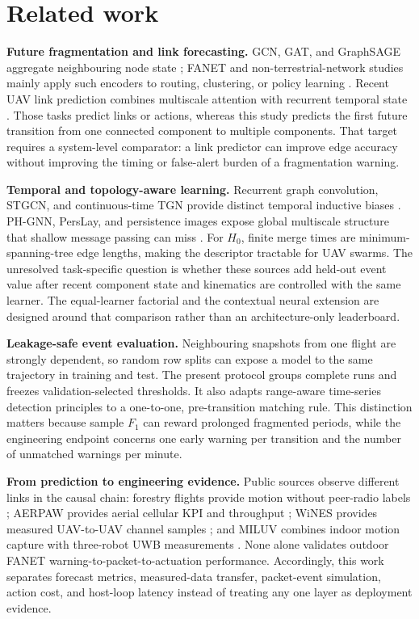 \documentclass[final,5p,times,twocolumn]{elsarticle}
\begin{document}
\section{Related work}

\textbf{Future fragmentation and link forecasting.} GCN, GAT, and GraphSAGE aggregate
neighbouring node state \cite{kipf2017semi,velickovic2018graph,hamilton2017inductive};
FANET and non-terrestrial-network studies mainly apply such encoders to routing,
clustering, or policy learning \cite{lu2023uav,song2025gnnppor,ye2022multi,nemati2022ntn,REN2025103801}.
Recent UAV link prediction combines multiscale attention with recurrent temporal state
\cite{pu2026must}. Those tasks predict links or actions, whereas this study predicts the
first future transition from one connected component to multiple components. That target
requires a system-level comparator: a link predictor can improve edge accuracy without
improving the timing or false-alert burden of a fragmentation warning.

\textbf{Temporal and topology-aware learning.} Recurrent graph convolution, STGCN, and
continuous-time TGN provide distinct temporal inductive biases
\cite{zhao2020tgcn,yu2018stgcn,rossi2020tgn}. PH-GNN, PersLay, and persistence images expose
global multiscale structure that shallow message passing can miss
\cite{hofer2017deep,carriere2020perslay,adams2017persistence}. For $H_0$, finite merge times
are minimum-spanning-tree edge lengths, making the descriptor tractable for UAV swarms.
The unresolved task-specific question is whether these sources add held-out event value
after recent component state and kinematics are controlled with the same learner. The
equal-learner factorial and the contextual neural extension are designed around that
comparison rather than an architecture-only leaderboard.

\textbf{Leakage-safe event evaluation.} Neighbouring snapshots from one flight are strongly
dependent, so random row splits can expose a model to the same trajectory in training and
test. The present protocol groups complete runs and freezes validation-selected thresholds.
It also adapts range-aware time-series detection principles \cite{tatbul2018precision} to a
one-to-one, pre-transition matching rule. This distinction matters because sample $F_1$
can reward prolonged fragmented periods, while the engineering endpoint concerns one early
warning per transition and the number of unmatched warnings per minute.

\textbf{From prediction to engineering evidence.} Public sources observe different links
in the causal chain: forestry flights provide motion without peer-radio labels
\cite{araujo2025multidrone}; AERPAW provides aerial cellular KPI and throughput
\cite{aerpawDataset22,aerpawDataset23}; WiNES provides measured UAV-to-UAV channel samples
\cite{winesUavToUav60GHz,polese2020experimental}; and MILUV combines indoor motion capture
with three-robot UWB measurements \cite{shalaby2026miluv,miluvDataset}. None alone validates
outdoor FANET warning-to-packet-to-actuation performance. Accordingly, this work separates
forecast metrics, measured-data transfer, packet-event simulation, action cost, and
host-loop latency instead of treating any one layer as deployment evidence.
\end{document}
